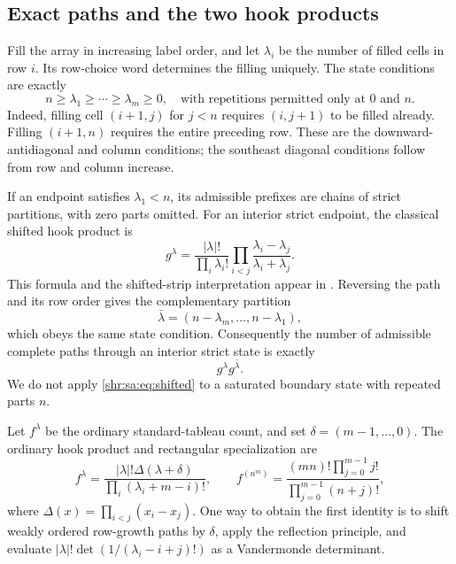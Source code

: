 \documentclass[11pt,letterpaper]{article}
\numberwithin{equation}{section}
\theoremstyle{definition}
\newcommand{\1}{\mathbf 1}
\newcommand{\D}{\Delta}
\begin{document}
\subsection{Exact paths and the two hook products}
Fill the array in increasing label order, and let $\lambda_i$ be the number of filled cells in row $i$. Its row-choice word determines the filling uniquely. The state conditions are exactly
\begin{equation}\label{shr:sa:eq:states}
 n\ge\lambda_1\ge\cdots\ge\lambda_m\ge0,
 \quad\text{with repetitions permitted only at $0$ and $n$.}
\end{equation}
Indeed, filling cell $(i+1,j)$ for $j<n$ requires $(i,j+1)$ to be filled already. Filling $(i+1,n)$ requires the entire preceding row. These are the downward-antidiagonal and column conditions; the southeast diagonal conditions follow from row and column increase.

If an endpoint satisfies $\lambda_1<n$, its admissible prefixes are chains of strict partitions, with zero parts omitted. For an interior strict endpoint, the classical shifted hook product is
\begin{equation}\label{shr:sa:eq:shifted}
 g^\lambda=\frac{|\lambda|!}{\prod_i\lambda_i!}
        \prod_{i<j}\frac{\lambda_i-\lambda_j}{\lambda_i+\lambda_j}.
\end{equation}
This formula and the shifted-strip interpretation appear in \cite{Sun}. Reversing the path and its row order gives the complementary partition
\[
 \bar\lambda=(n-\lambda_m,\ldots,n-\lambda_1),
\]
which obeys the same state condition. Consequently the number of admissible complete paths through an interior strict state is exactly
\begin{equation}\label{shr:sa:eq:through}
 g^\lambda g^{\bar\lambda}.
\end{equation}
We do not apply \eqref{shr:sa:eq:shifted} to a saturated boundary state with repeated parts $n$.

Let $f^\lambda$ be the ordinary standard-tableau count, and set $\delta=(m-1,\ldots,0)$. The ordinary hook product and rectangular specialization are
\begin{equation}\label{shr:sa:eq:ordinary}
 f^\lambda=\frac{|\lambda|!\D(\lambda+\delta)}
                  {\prod_i(\lambda_i+m-i)!},\qquad
 f^{(n^m)}=\frac{(mn)!\prod_{j=0}^{m-1}j!}
                    {\prod_{j=0}^{m-1}(n+j)!},
\end{equation}
where $\D(x)=\prod_{i<j}(x_i-x_j)$. One way to obtain the first identity is to shift weakly ordered row-growth paths by $\delta$, apply the reflection principle, and evaluate
$|\lambda|!\det(1/(\lambda_i-i+j)!)$ as a Vandermonde determinant.
\end{document}

